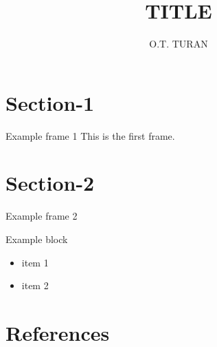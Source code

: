 \documentclass{beamer}
\title[]{TITLE}
\institute[]{Delft University of Technology, The Netherlands}
\author{O.T. TURAN}
\begin{document}
{
\def\beamer@entrycode{\vspace*{-\headheight}}
\frame{\titlepage}
}

{

}

\section{Section-1}
\begin{frame}{Example frame 1}
This is the first frame. \@author{}
\end{frame}

\section{Section-2}

\begin{frame}{Example frame 2}
\begin{block}{Example block}
\begin{itemize}
\item item 1
\item item 2
\end{itemize}
\end{block}
\end{frame}

\section{References}
\begin{frame}
	\printbibliography
\end{frame}
\end{document}
